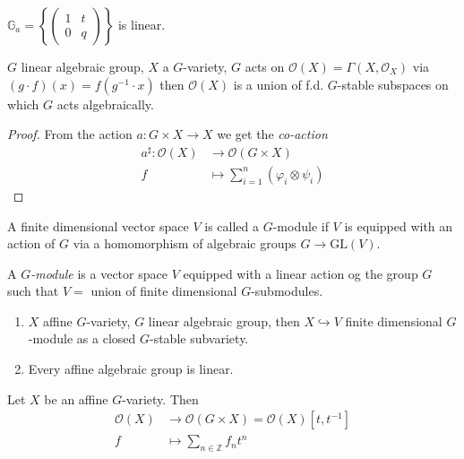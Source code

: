 \begin{example}
\label{example-multiplicative-group-is-linear}
$\mathbb{G}_a=\left\{\begin{pmatrix}
1&t\\ 
0&q
\end{pmatrix}\right\}$ is linear.
\end{example}

\begin{proposition}
\label{proposition-co-action}
$G$ linear algebraic group,  $X$ a $G$-variety, $G$ acts on
$\mathcal{O}(X)=\Gamma(X,\mathcal{O}_X)$ via $(g\cdot f)(x)=f(g^{-1}\cdot x)$
then $\mathcal{O}(X)$ is a union of f.d. $G$-stable subspaces on which $G$ acts
algebraically.
\end{proposition}

\begin{proof}
From the action $a:G \times X \to X$ we get the {\it co-action} 
\begin{align*}
a^\sharp: \mathcal{O}(X) &\longrightarrow \mathcal{O}(G \times X) \\
f &\longmapsto \sum_{i=1}^n(\varphi_i \otimes \psi_i)
\end{align*}
\end{proof}

\begin{definition}
\label{definition-}
A finite dimensional vector space $V$ is called a $G$-module if $V$ is equipped
with an action of $G$ via a homomorphism of algebraic groups 
$G \to \text{GL}(V)$.

A  {\it $G$-module} is a vector space $V$ equipped with a linear action og the
group $G$ such that $V=$ union of finite dimensional $G$-submodules.
\end{definition}

\begin{proposition}
\label{proposition-}
 \begin{enumerate}
\item $X$ affine $G$-variety, $G$ linear algebraic group, then $X
\hookrightarrow  V$ finite dimensional $G$-module as a closed $G$-stable
subvariety.
\item Every affine algebraic group is linear.
\end{enumerate}
\end{proposition}

Let $X$ be an affine $G$-variety. Then
\begin{align*}
\mathcal{O}(X) &\longrightarrow \mathcal{O}(G\times X)
=\mathcal{O}(X)[t,t^{-1}] \\
f &\longmapsto \sum_{n \in \mathbb{Z}}f_n t^n
\end{align*}

